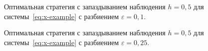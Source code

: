 \begin{figure}[bh]
        \noindent{}
        \caption{Оптимальная стратегия с запаздыванием наблюдения $h = 0,\!5$ для системы~\eqref{eq:x-example} с разбиением $\varepsilon = 0,\!1$.}
        \label{img:red-01}
\end{figure}
\begin{figure}[bh]
        \noindent{}
        \caption{Оптимальная стратегия с запаздыванием наблюдения $h = 0,\!5$ для системы~\eqref{eq:x-example} с разбиением $\varepsilon = 0,\!25$.}
        \label{img:red-025}
\end{figure}
